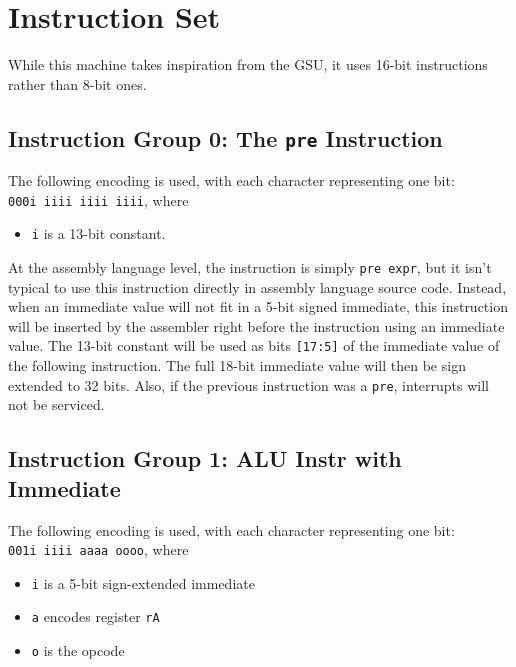 \documentclass{article}
\begin{document}
	\newpage
	\section{Instruction Set}
	While this machine takes inspiration from the GSU, it uses 16-bit
	instructions rather than 8-bit ones.

	\subsection{Instruction Group 0:  The \texttt{pre} Instruction}
	The following encoding is used, with each character representing one
	bit:  \\
	\texttt{000i iiii iiii iiii}, where 
	
	\singlespacing
	\begin{itemize}
		\item \texttt{i} is a 13-bit constant.
	\end{itemize}

	At the assembly language level, the instruction is simply
	\texttt{pre expr}, but it isn't typical to use this instruction
	directly in assembly language source code.  Instead, when an immediate
	value will not fit in a 5-bit signed immediate, this instruction will
	be inserted by the assembler right before the instruction using an
	immediate value.  The 13-bit constant will be used as bits
	\texttt{[17:5]} of the immediate value of the following instruction.
	The full 18-bit immediate value will then be sign extended to 32 bits.
	Also, if the previous instruction was a \texttt{pre}, interrupts will
	not be serviced.

	\subsection{Instruction Group 1:  ALU Instr with Immediate}
	The following encoding is used, with each character representing one
	bit:  \\
	\texttt{001i iiii aaaa oooo}, where

	\singlespacing
	\begin{itemize}
		\item \texttt{i} is a 5-bit sign-extended immediate
		\item \texttt{a} encodes register \texttt{rA}
		\item \texttt{o} is the opcode
	\end{itemize}
	\doublespacing
\end{document}
